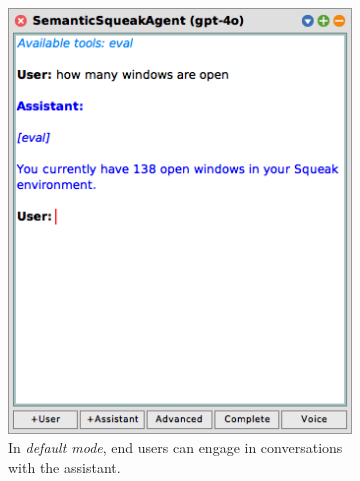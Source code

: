 \begin{figure}[t]
	\centering
    \begin{subfigure}[t]{0.5\dimexpr\textwidth-1em\relax}
        \centering
        \includegraphics[width=\textwidth]{03_tools/editor/default.png}
        \caption{In \emph{default mode}, end users can engage in conversations with the assistant.}
        \label{fig:semtex/tools/editor/default}
    \end{subfigure}
    \hfill
    \begin{subfigure}[t]{0.5\dimexpr\textwidth-1em\relax}
        \centering

\end{subfigure}
\end{figure}
